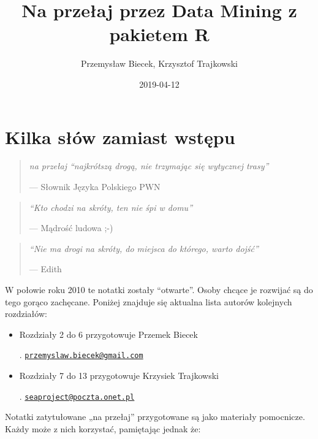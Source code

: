 \documentclass[polish,]{book}
\title{Na przełaj przez Data Mining z pakietem R}
\author{Przemysław Biecek, Krzysztof Trajkowski}
\date{2019-04-12}
\begin{document}
\maketitle

{
\hypersetup{linkcolor=black}
\setcounter{tocdepth}{2}
\tableofcontents
}
\hypertarget{part_1}{%
\chapter{Kilka słów zamiast wstępu}\label{part_1}}

\begin{quote}
\emph{na przełaj ``najkrótszą drogą, nie trzymając się wytycznej trasy''}

--- Słownik Języka Polskiego PWN
\end{quote}

\begin{quote}
\emph{``Kto chodzi na skróty, ten nie śpi w domu''}

--- Mądrość ludowa ;-)
\end{quote}

\begin{quote}
\emph{``Nie ma drogi na skróty, do miejsca do którego, warto dojść''}

--- Edith
\end{quote}

W połowie roku 2010 te notatki zostały ``otwarte''. Osoby chcące je rozwijać
są do tego gorąco zachęcane. Poniżej znajduje się aktualna lista autorów kolejnych
rozdziałów:

\begin{itemize}
\item
  Rozdziały 2 do 6 przygotowuje Przemek Biecek

  . \href{mailto:przemyslaw.biecek@gmail.com}{\nolinkurl{przemyslaw.biecek@gmail.com}}
\item
  Rozdziały 7 do 13 przygotowuje Krzysiek Trajkowski

  . \href{mailto:seaproject@poczta.onet.pl}{\nolinkurl{seaproject@poczta.onet.pl}}
\end{itemize}

Notatki zatytułowane „na przełaj'' przygotowane są jako materiały pomocnicze.
Każdy może z nich korzystać, pamiętając jednak że:
\end{document}
